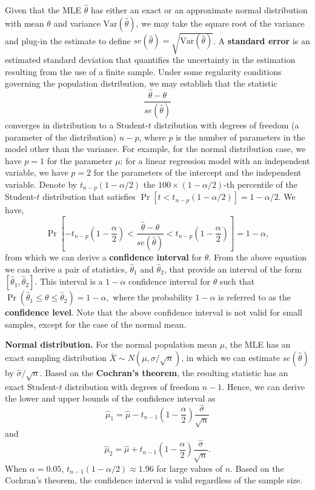\documentclass[]{book}
\theoremstyle{definition}
\theoremstyle{definition}
\theoremstyle{definition}
\theoremstyle{remark}
\begin{document}
Given that the MLE \(\hat{\theta}\) has either an exact or an
approximate normal distribution with mean \(\theta\) and variance
\(\mathrm{Var}(\hat{\theta})\), we may take the square root of the
variance and plug-in the estimate to define
\(se(\hat{\theta}) = \sqrt{\mathrm{Var}(\hat{\theta})}\). A
\textbf{standard error} is an estimated standard deviation that
quantifies the uncertainty in the estimation resulting from the use of a
finite sample. Under some regularity conditions governing the population
distribution, we may establish that the statistic
\[\frac{\hat{\theta}-\theta}{se(\hat{\theta})}\] converges in
distribution to a Student-\(t\) distribution with degrees of freedom (a
parameter of the distribution) \({n-p}\), where \(p\) is the number of
parameters in the model other than the variance. For example, for the
normal distribution case, we have \(p=1\) for the parameter \(\mu\); for
a linear regression model with an independent variable, we have \(p=2\)
for the parameters of the intercept and the independent variable. Denote
by \(t_{n-p}(1-\alpha/2)\) the \(100\times(1-\alpha/2)\)-th percentile
of the Student-\(t\) distribution that satisfies
\(\Pr\left[t< t_{n-p}\left(1-{\alpha}/{2}\right) \right]= 1-{\alpha}/{2}\).
We have,
\[\Pr\left[-t_{n-p}\left(1-\frac{\alpha}{2}\right)<\frac{\hat{\theta}-\theta}{se(\hat{\theta})}< t_{n-p}\left(1-\frac{\alpha}{2}\right) \right]= 1-{\alpha},\]
from which we can derive a \textbf{confidence interval} for \(\theta\).
From the above equation we can derive a pair of statistics,
\(\hat{\theta}_1\) and \(\hat{\theta}_2\), that provide an interval of
the form \([\hat{\theta}_1, \hat{\theta}_2]\). This interval is a
\(1-\alpha\) confidence interval for \(\theta\) such that
\(\Pr\left(\hat{\theta}_1 \le \theta \le \hat{\theta}_2\right) = 1-\alpha,\)
where the probability \(1-\alpha\) is referred to as the
\textbf{confidence level}. Note that the above confidence interval is
not valid for small samples, except for the case of the normal mean.

\textbf{Normal distribution.} For the normal population mean \(\mu\),
the MLE has an exact sampling distribution
\(\bar{X}\sim N(\mu,\sigma/\sqrt{n})\), in which we can estimate
\(se(\hat{\theta})\) by \(\hat{\sigma}/\sqrt{n}\). Based on the
\textbf{Cochran's theorem}, the resulting statistic has an exact
Student-\(t\) distribution with degrees of freedom \(n-1\). Hence, we
can derive the lower and upper bounds of the confidence interval as
\[\hat{\mu}_1 = \hat{\mu} - t_{n-1}\left(1-\frac{\alpha}{2}\right)\frac{ \hat{\sigma}}{\sqrt{n}}\]
and
\[\hat{\mu}_2 = \hat{\mu} + t_{n-1}\left(1-\frac{\alpha}{2}\right)\frac{ \hat{\sigma}}{\sqrt{n}}.\]
When \(\alpha = 0.05\), \(t_{n-1}(1-\alpha/2) \approx 1.96\) for large
values of \(n\). Based on the Cochran's theorem, the confidence interval
is valid regardless of the sample size.
\end{document}
